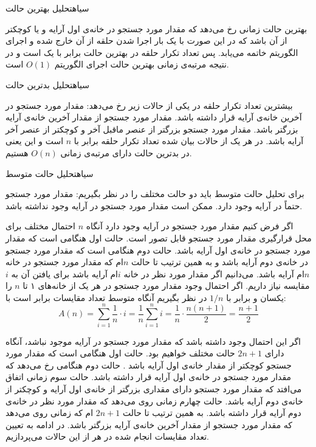 {‌سیاه{تحلیل بهترین حالت}

بهترین حالت زمانی رخ می‌دهد که مقدار مورد جستجو در خانه‌ی اول آرایه و یا کوچکتر از آن باشد که در این صورت با یک بار اجرا شدن حلقه‌ از آن خارج شده و اجرای الگوریتم خاتمه می‌یابد. پس تعداد تکرار حلقه در بهترین حالت برابر با یک است و در نتیجه مرتبه‌ی زمانی بهترین حالت اجرای الگوریتم {$O(1)$} است.

‌سیاه{تحلیل بدترین حالت}

بیشترین تعداد تکرار حلقه در یکی از حالات زیر رخ می‌دهد:
 مقدار مورد جستجو در آخرین خانه‌ی آرایه قرار داشته باشد.
 مقدار مورد جستجو از مقدار آخرین خانه‌ی آرایه بزرگتر باشد.
 مقدار مورد جستجو بزرگتر از عنصر ماقبل آخر و کوچکتر از عنصر آخر آرایه باشد.
در هر یک از حالات بیان شده تعداد تکرار حلقه برابر با {$n$} است و این یعنی در بدترین حالت دارای مرتبه‌ی زمانی {$O(n)$} هستیم.

‌سیاه{تحلیل حالت متوسط}

برای تحلیل حالت متوسط باید دو حالت مختلف را در نظر بگیریم:
 مقدار مورد جستجو حتماً در آرایه وجود دارد.
 ممکن است مقدار مورد جستجو در آرایه وجود نداشته باشد.

اگر فرض کنیم مقدار مورد جستجو در آرایه‌ وجود دارد آنگاه {$n$} احتمال مختلف برای محل قرارگیری مقدار مورد جستجو قابل تصور است. حالت اول هنگامی است که مقدار مورد جستجو در خانه‌ی اول آرایه باشد. حالت دوم هنگامی است که مقدار مورد جستجو در خانه‌ی دوم آرایه باشد و به همین ترتیب تا حالت {$n$}ام که مقدار مورد جستجو در خانه {$n$}ام آرایه باشد. می‌دانیم اگر مقدار مورد نظر در خانه {$i$}ام آرایه باشد برای یافتن آن به {$i$} مقایسه نیاز داریم. اگر احتمال وجود مقدار مورد جستجو در هر یک از خانه‌های ۱ تا {$n$} را یکسان و برابر با {$1/n$} در نظر بگیریم آنگاه متوسط تعداد مقایسات برابر است با:
\begin{displaymath}
A(n)=\sum_{i=1}^n{\frac{1}{n} \cdot i}=\frac{1}{n} \sum_{i=1}^n{ i}=\frac{1}{n} \cdot \frac{n(n+1)}{2}=\frac{n+1}{2}
\end{displaymath}

اگر این احتمال وجود داشته باشد که مقدار مورد جستجو در آرایه موجود نباشد، آنگاه دارای {$2n+1$} حالت مختلف خواهیم بود. حالت اول هنگامی ‌است که مقدار مورد جستجو کوچکتر از مقدار خانه‌ی اول آرایه باشد . حالت دوم هنگامی رخ می‌دهد که مقدار مورد جستجو در خانه‌ی اول آرایه قرار داشته باشد. حالت سوم زمانی اتفاق می‌افتد که مقدار مورد جستجو دارای مقداری بزرگتر از خانه‌ی اول آرایه و کوچکتر از خانه‌ی دوم آرایه باشد. حالت چهارم زمانی روی می‌دهد که مقدار مورد نظر در خانه‌ی دوم آرایه قرار داشته باشد. به همین ترتیب تا حالت {$2n+1$} ام که زمانی روی می‌دهد که مقدار مورد جستجو از مقدار آخرین خانه‌ی آرایه بزرگتر باشد. در ادامه به تعیین تعداد مقایسات انجام ‌شده در هر از این حالات می‌پردازیم.

}
